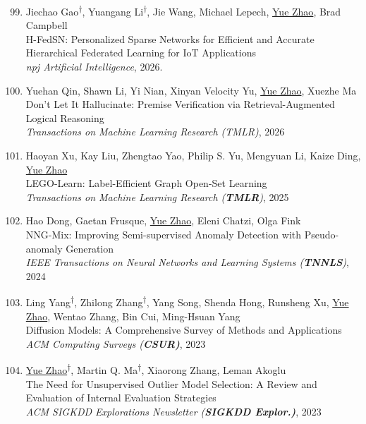 \documentclass[margin,line,pifont,palatino,courier]{res}
\newcommand{\equalcontrib}{\textsuperscript{$\dagger$}}
\newenvironment{benumerate}[1]{
    \let\oldItem\item
    \def\item{\addtocounter{enumi}{-2}\oldItem}
    \begin{enumerate}[leftmargin=0.25in,label=\textcolor{uscred}{\arabic*.}]
    \setcounter{enumi}{#1}
    \addtocounter{enumi}{1}
}{
    \end{enumerate}
}
\begin{document}
\begin{resume}
\begin{benumerate}{98}
    \item Jiechao Gao\equalcontrib, Yuangang Li\equalcontrib, Jie Wang, Michael Lepech, \underline{Yue Zhao}, Brad Campbell\\
    H-FedSN: Personalized Sparse Networks for Efficient and Accurate Hierarchical Federated Learning for IoT Applications\\
    \textit{npj Artificial Intelligence}, 2026.

    \item Yuehan Qin, Shawn Li, Yi Nian, Xinyan Velocity Yu, \underline{Yue Zhao}, Xuezhe Ma\\
    Don't Let It Hallucinate: Premise Verification via Retrieval-Augmented Logical Reasoning\\
    \textit{Transactions on Machine Learning Research (TMLR)}, 2026

    \item Haoyan Xu, Kay Liu, Zhengtao Yao, Philip S. Yu, Mengyuan Li, Kaize Ding, \underline{Yue Zhao} \\
    LEGO-Learn: Label-Efficient Graph Open-Set Learning\\
    {\textit{Transactions on Machine Learning Research (\textbf{TMLR})}}, 2025

    \item Hao Dong, Gaetan Frusque, \underline{Yue Zhao}, Eleni Chatzi, Olga Fink\\
    NNG-Mix: Improving Semi-supervised Anomaly Detection with Pseudo-anomaly Generation\\
    {\textit{IEEE Transactions on Neural Networks and Learning Systems (\textbf{TNNLS})}}, 2024


    \item Ling Yang\equalcontrib, Zhilong Zhang\equalcontrib, Yang Song, Shenda Hong, Runsheng Xu, \underline{Yue Zhao}, Wentao Zhang, Bin Cui, Ming-Hsuan Yang\\
    Diffusion Models: A Comprehensive Survey of Methods and Applications \\ 
    {\textit{ACM Computing Surveys (\textbf{{CSUR})}}, 2023}


    \item \underline{Yue Zhao\equalcontrib}, Martin Q. Ma\equalcontrib, Xiaorong Zhang, Leman Akoglu\\
    The Need for Unsupervised Outlier Model Selection:
A Review and Evaluation of Internal Evaluation Strategies\\ 
    {\textit{ACM SIGKDD Explorations Newsletter (\textbf{{SIGKDD} Explor.)}}, 2023}


\end{benumerate}
\end{resume}
\end{document}

